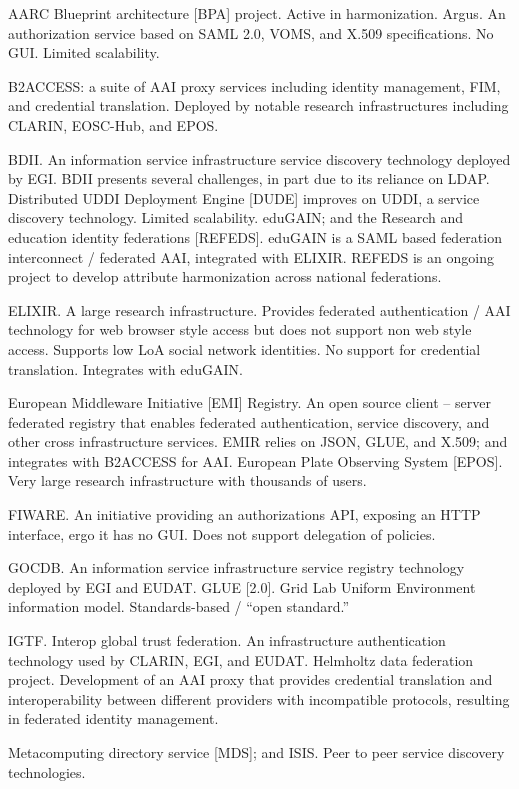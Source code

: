 \documentclass[12pt]{article}
\begin{document}
AARC Blueprint architecture [BPA] project. Active in harmonization. 
Argus. An authorization service based on SAML 2.0, VOMS, and X.509 specifications. No GUI. Limited scalability. 

B2ACCESS: a suite of AAI proxy services including identity management, FIM, and credential translation. Deployed by notable research infrastructures including CLARIN, EOSC-Hub, and EPOS.  

BDII. An information service infrastructure service discovery technology deployed by EGI. BDII presents several challenges, in part due to its reliance on LDAP. 
Distributed UDDI Deployment Engine [DUDE] improves on UDDI, a service discovery technology. Limited scalability. 
eduGAIN; and the Research and education identity federations [REFEDS]. eduGAIN is a SAML based federation interconnect / federated AAI, integrated with ELIXIR. REFEDS is an ongoing project to develop attribute harmonization across national federations. 

ELIXIR. A large research infrastructure. Provides federated authentication / AAI technology for web browser style access but does not support non web style access. Supports low LoA social network identities. No support for credential translation. Integrates with eduGAIN. 

European Middleware Initiative [EMI] Registry. An open source client – server federated registry that enables federated authentication, service discovery, and other cross infrastructure services. EMIR relies on JSON, GLUE, and X.509; and integrates with B2ACCESS for AAI. European Plate Observing System [EPOS]. Very large research infrastructure with thousands of users. 

FIWARE. An initiative providing an authorizations API, exposing an HTTP interface, ergo it has no GUI. Does not support delegation of policies. 

GOCDB. An information service infrastructure service registry technology deployed by EGI and EUDAT. 
GLUE [2.0]. Grid Lab Uniform Environment information model. Standards-based / “open standard.” 

IGTF. Interop global trust federation. An infrastructure authentication technology used by CLARIN, EGI, and EUDAT. 
Helmholtz data federation project. Development of an AAI proxy that provides credential translation and interoperability between different providers with incompatible protocols, resulting in federated identity management. 

Metacomputing directory service [MDS]; and ISIS. Peer to peer service discovery technologies. 
\end{document}
